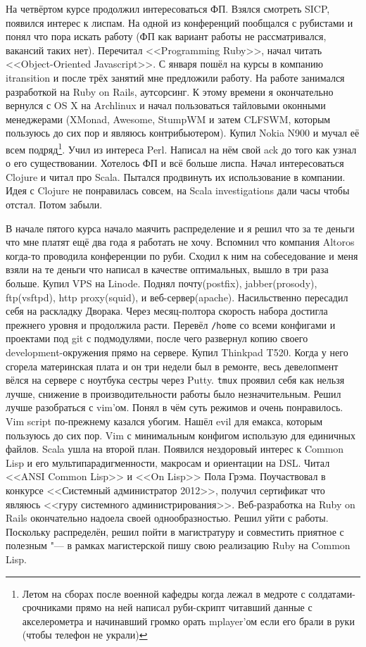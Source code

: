 \documentclass[14pt,a4paper]{extarticle}
\begin{document}
На четвёртом курсе продолжил интересоваться ФП. Взялся смотреть
SICP, появился интерес к лиспам. На одной из конференций
пообщался с рубистами и понял что пора искать работу (ФП как вариант
работы не рассматривался, вакансий таких нет). Перечитал <<Programming
Ruby>>, начал читать <<Object-Oriented Javascript>>. С января пошёл на курсы
в компанию itransition и после трёх занятий мне предложили работу.
На работе занимался разработкой на Ruby on Rails, аутсорсинг. К
этому времени я окончательно вернулся с OS X на Archlinux и начал
пользоваться тайловыми оконными менеджерами (XMonad, Awesome,
StumpWM и затем CLFSWM, которым пользуюсь до сих пор и являюсь
контрибьютером). Купил Nokia N900 и мучал её всем подряд\footnote{
Летом на сборах после военной кафедры когда лежал в медроте с
солдатами-срочниками прямо на ней написал руби-скрипт читавший данные
с акселерометра и начинавший громко орать mplayer'ом если его брали в
руки (чтобы телефон не украли)}. Учил из
интереса Perl. Написал на нём свой ack до того как узнал о его
существовании. Хотелось ФП и всё больше лиспа. Начал интересоваться
Clojure и читал про Scala. Пытался продвинуть их использование в
компании. Идея с Clojure не понравилась совсем, на Scala
investigations дали часы чтобы отстал. Потом забыли.

В начале пятого курса начало маячить распределение и я решил что за те
деньги что мне платят ещё два года я работать не
хочу. Вспомнил что компания Altoros когда-то проводила конференции по
руби. Сходил к ним на собеседование и меня взяли на те деньги что
написал в качестве оптимальных, вышло в три раза больше. Купил VPS на
Linode. Поднял почту(postfix), jabber(prosody), ftp(vsftpd), http
proxy(squid), и веб-сервер(apache). Насильственно пересадил себя на
раскладку Дворака. Через месяц-полтора скорость набора достигла
прежнего уровня и продолжила расти. Перевёл {\tt /home} со всеми
конфигами и проектами под git с подмодулями, после чего развернул копию своего
development-окружения прямо на сервере. Купил Thinkpad T520. Когда у
него сгорела материнская плата и он три недели был в ремонте,
весь девелопмент вёлся на сервере с ноутбука сестры через Putty. {\tt tmux}
проявил себя как нельзя лучше, снижение в производительности работы
было незначительным. Решил лучше разобраться с vim'ом. Понял в чём
суть режимов и очень понравилось. Vim script по-прежнему казался
убогим. Нашёл evil для емакса, которым пользуюсь до сих пор. Vim с
минимальным конфигом использую для единичных файлов. Scala ушла на
второй план. Появился нездоровый интерес к Common Lisp и его
мультипарадигменности, макросам и ориентации на DSL. Читал <<ANSI Common
Lisp>> и <<On Lisp>> Пола Грэма. Поучаствовал в конкурсе <<Системный
администратор 2012>>, получил сертификат что являюсь <<гуру системного
администрирования>>. Веб-разработка на Ruby on Rails окончательно надоела своей
однообразностью. Решил уйти с работы. Поскольку распределён, решил
пойти в магистратуру и совместить приятное с полезным "--- в рамках
магистерской пишу свою реализацию Ruby на Common Lisp.
\end{document}
